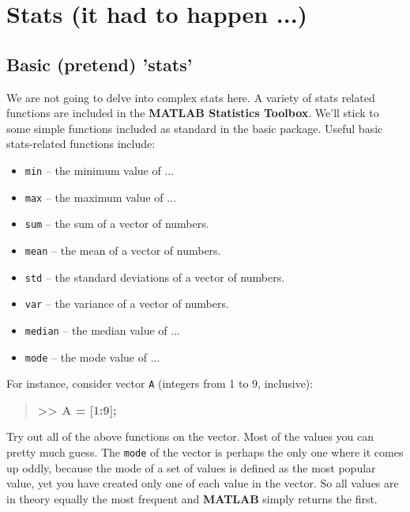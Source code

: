 \documentclass{tufte-book} %
\newenvironment{docspecbold}{\begin{quotation}\ttfamily\bfseries\parskip0pt\parindent0pt\ignorespaces}{\end{quotation}}
\begin{document}

\newpage


\section{Stats (it had to happen ...)}


\subsection{Basic (pretend) 'stats'}

We are not going to delve into complex stats here. A variety of stats related functions are included in the \textbf{MATLAB Statistics Toolbox}. We'll stick to some simple functions included as standard in the basic package. 
Useful basic stats-related functions include:

\begin{itemize}[noitemsep]
\setlength{\itemindent}{.2in}
\item \texttt{min} -- the minimum value of ...
\item \texttt{max} -- the maximum value of ...
\item \texttt{sum} -- the sum of a vector of numbers.
\item \texttt{mean} -- the mean of a vector of numbers.
\item \texttt{std} -- the standard deviations of a vector of numbers.
\item \texttt{var} -- the variance of a vector of numbers.
\item \texttt{median} -- the median value of ...
\item \texttt{mode} -- the mode value of ...
\end{itemize}

For instance, consider vector \texttt{A} (integers from 1 to 9, inclusive):
\begin{docspecbold}
>> A = [1:9];
\end{docspecbold}

Try out all of the above functions on the vector. Most of the values you can pretty much guess. The \texttt{mode} of the vector is perhaps the only one where it comes up oddly, because the mode of a set of values is defined as the most popular value, yet you have created only one of each value in the vector. So all values are in theory equally the most frequent and \textbf{MATLAB} simply returns the first.
\end{document}
